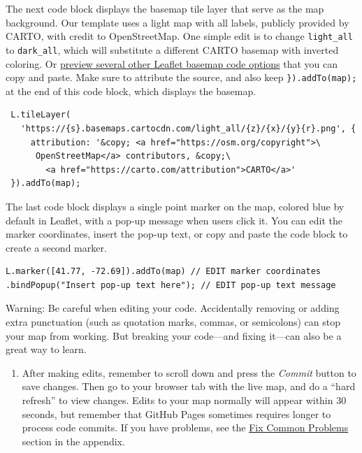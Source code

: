 \documentclass[
  english,
]{book}
\providecommand{\tightlist}{%
  \setlength{\itemsep}{0pt}\setlength{\parskip}{0pt}}
\begin{document}
The next code block displays the basemap tile layer that serve as the map background. Our template uses a light map with all labels, publicly provided by CARTO, with credit to OpenStreetMap. One simple edit is to change \texttt{light\_all} to \texttt{dark\_all}, which will substitute a different CARTO basemap with inverted coloring. Or \href{https://leaflet-extras.github.io/leaflet-providers/preview/}{preview several other Leaflet basemap code options} that you can copy and paste. Make sure to attribute the source, and also keep \texttt{\}).addTo(map);} at the end of this code block, which displays the basemap.

\begin{verbatim}
 L.tileLayer(
   'https://{s}.basemaps.cartocdn.com/light_all/{z}/{x}/{y}{r}.png', {
     attribution: '&copy; <a href="https://osm.org/copyright">\
      OpenStreetMap</a> contributors, &copy;\
        <a href="https://carto.com/attribution">CARTO</a>'
 }).addTo(map);
\end{verbatim}

The last code block displays a single point marker on the map, colored blue by default in Leaflet, with a pop-up message when users click it. You can edit the marker coordinates, insert the pop-up text, or copy and paste the code block to create a second marker.

\begin{verbatim}
L.marker([41.77, -72.69]).addTo(map) // EDIT marker coordinates
.bindPopup("Insert pop-up text here"); // EDIT pop-up text message
\end{verbatim}

Warning: Be careful when editing your code. Accidentally removing or adding extra punctuation (such as quotation marks, commas, or semicolons) can stop your map from working. But breaking your code---and fixing it---can also be a great way to learn.

\begin{enumerate}
\def\labelenumi{\arabic{enumi}.}
\setcounter{enumi}{14}
\tightlist
\item
  After making edits, remember to scroll down and press the \emph{Commit} button to save changes. Then go to your browser tab with the live map, and do a ``hard refresh'' to view changes. Edits to your map normally will appear within 30 seconds, but remember that GitHub Pages sometimes requires longer to process code commits. If you have problems, see the \href{fix.html}{Fix Common Problems} section in the appendix.
\end{enumerate}
\end{document}
